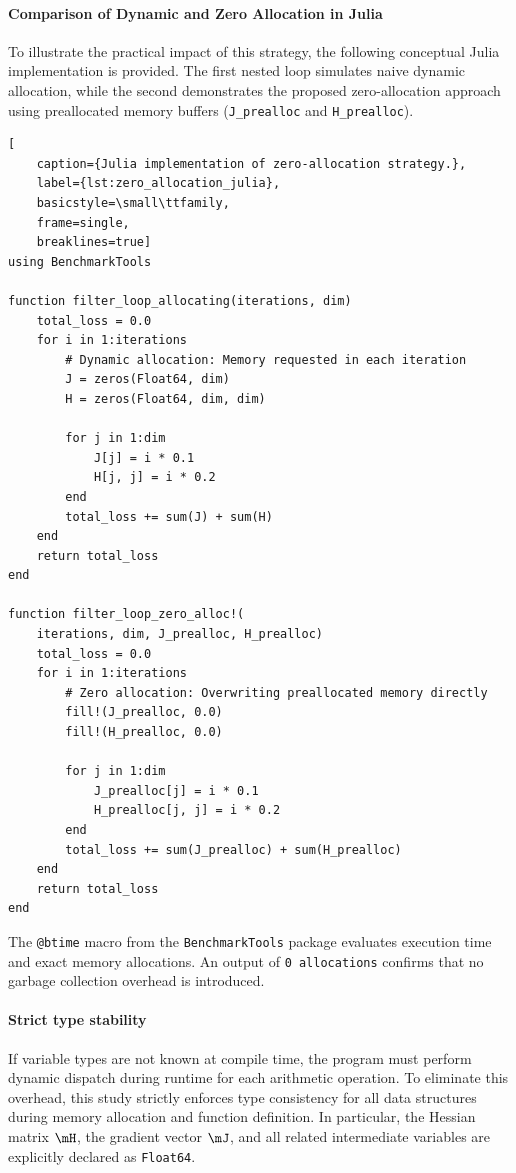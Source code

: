 \paragraph{Comparison of Dynamic and Zero Allocation in Julia}
To illustrate the practical impact of this strategy, the following conceptual Julia implementation is provided. The first nested loop simulates naive dynamic allocation, while the second demonstrates the proposed zero-allocation approach using preallocated memory buffers (\texttt{J\_prealloc} and \texttt{H\_prealloc}).
\clearpage
\begin{lstlisting}[
    caption={Julia implementation of zero-allocation strategy.},
    label={lst:zero_allocation_julia},
    basicstyle=\small\ttfamily,
    frame=single,
    breaklines=true]
using BenchmarkTools

function filter_loop_allocating(iterations, dim)
    total_loss = 0.0
    for i in 1:iterations
        # Dynamic allocation: Memory requested in each iteration
        J = zeros(Float64, dim)
        H = zeros(Float64, dim, dim)

        for j in 1:dim
            J[j] = i * 0.1
            H[j, j] = i * 0.2
        end
        total_loss += sum(J) + sum(H)
    end
    return total_loss
end

function filter_loop_zero_alloc!(
    iterations, dim, J_prealloc, H_prealloc)
    total_loss = 0.0
    for i in 1:iterations
        # Zero allocation: Overwriting preallocated memory directly
        fill!(J_prealloc, 0.0)
        fill!(H_prealloc, 0.0)

        for j in 1:dim
            J_prealloc[j] = i * 0.1
            H_prealloc[j, j] = i * 0.2
        end
        total_loss += sum(J_prealloc) + sum(H_prealloc)
    end
    return total_loss
end
\end{lstlisting}
\begin{Remark}
The \texttt{@btime} macro from the \texttt{BenchmarkTools} package evaluates execution time and exact memory allocations. An output of \texttt{0 allocations} confirms that no garbage collection overhead is introduced.
\end{Remark}

\paragraph{Strict type stability} If variable types are not known at compile time, the program must perform dynamic dispatch during runtime for each arithmetic operation. To eliminate this overhead, this study strictly enforces type consistency for all data structures during memory allocation and function definition. In particular, the Hessian matrix $\mH$, the gradient vector $\mJ$, and all related intermediate variables are explicitly declared as \texttt{Float64}.

